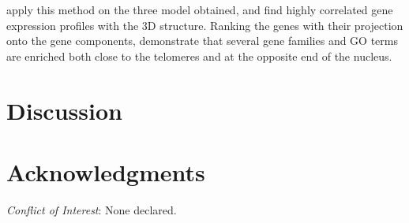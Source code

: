 \documentclass[letterpaper,12pt]{article}
\begin{document}
\citet{ay:three-dimensional} apply this method on the three model obtained,
and find highly correlated gene expression profiles with the 3D structure.
Ranking the genes with their projection onto the gene components,
\citet{ay:three-dimensional} demonstrate that several gene families and GO
terms are enriched both close to the telomeres and at the opposite end of the
nucleus.


\section{Discussion}

\section*{Acknowledgments}



{\it Conflict of Interest}: None declared.






\begin{figure}[!p]
\centering
\caption{}
\label{Fig1}
\end{figure}
\end{document}
